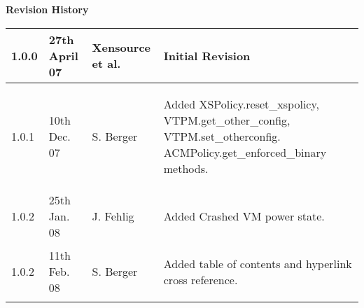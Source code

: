 { \bf Revision History}

\begin{center}
 \begin{tabular}{|l|l|l|l|}
  \hline
  1.0.0 & 27th April 07 & Xensource et al. &
   \begin{minipage}[t][.7cm]{7cm}
     Initial Revision
   \end{minipage}\\
  \hline
  1.0.1 & 10th Dec. 07 & S. Berger &
   \begin{minipage}[t]{7cm}
    \begin{flushleft}
     Added XSPolicy.reset\_xspolicy, VTPM.get\_other\_config,
     VTPM.set\_otherconfig. ACMPolicy.get\_enforced\_binary methods.
    \end{flushleft}
   \end{minipage}\\
  \hline
  1.0.2 & 25th Jan. 08 & J. Fehlig &
   \begin{minipage}[t]{7cm}
    \begin{flushleft}
     Added Crashed VM power state.
    \end{flushleft}
   \end{minipage}\\
  \hline
  1.0.2 & 11th Feb. 08 & S. Berger &
   \begin{minipage}[t]{7cm}
    \begin{flushleft}
     Added table of contents and hyperlink cross reference.
    \end{flushleft}
   \end{minipage}\\
  \hline
 \end{tabular}
\end{center}